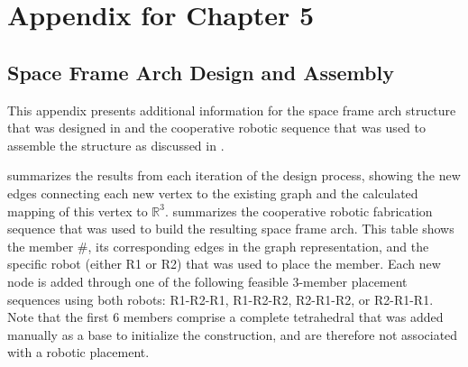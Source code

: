 

\clearpage
\chapter{Appendix for Chapter 5}


\section{Space Frame Arch Design and Assembly} \label{sec:appendixB_space}
    This appendix presents additional information for the space frame arch structure that was designed in  and the cooperative robotic sequence that was used to assemble the structure as discussed in .
    
     summarizes the results from each iteration of the design process, showing the new edges connecting each new vertex to the existing graph and the calculated mapping of this vertex to $\mathbb{R}^3$.  summarizes the cooperative robotic fabrication sequence that was used to build the resulting space frame arch. This table shows the member \#, its corresponding edges in the graph representation, and the specific robot (either R1 or R2) that was used to place the member. Each new node is added through one of the following feasible 3-member placement sequences using both robots: R1-R2-R1, R1-R2-R2, R2-R1-R2, or R2-R1-R1. Note that the first 6 members comprise a complete tetrahedral that was added manually as a base to initialize the construction, and are therefore not associated with a robotic placement. 

\newpage


